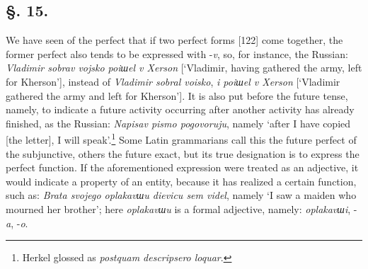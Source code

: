 \begin{table}
\end{table}

\subsection*{\hspace*{\fill}§. 15.\hspace*{\fill}}

We have seen of the perfect that if two perfect forms [122] come together, the former perfect also tends to be expressed with -\textit{v}, so, for instance, the Russian: \textit{Vladimir sobrav vojsko poiшel v Xerson} [‘Vladimir, having gathered the army, left for Kherson’], instead of \textit{Vladimir sobral voisko}, \textit{i poiшel v Xerson} [‘Vladimir gathered the army and left for Kherson’]. It is also put before the future tense, namely, to indicate a future activity occurring after another activity has already finished, as the Russian: \textit{Napisav pismo pogovoruju}, namely ‘after I have copied [the letter], I will speak’.\footnote{Herkel glossed as \textit{postquam descripsero loquar}.} Some Latin grammarians call this the future perfect of the subjunctive, others the future exact, but its true designation is to express the perfect function. If the aforementioned expression were treated as an adjective, it would indicate a property of an entity, because it has realized a certain function, such as: \textit{Brata svojego oplakavшu dievicu sem videl}, namely ‘I saw a maiden who mourned her brother’; here \textit{oplakavшu} is a formal adjective, namely: \textit{oplakavшi}, -\textit{a}, -\textit{o}.

